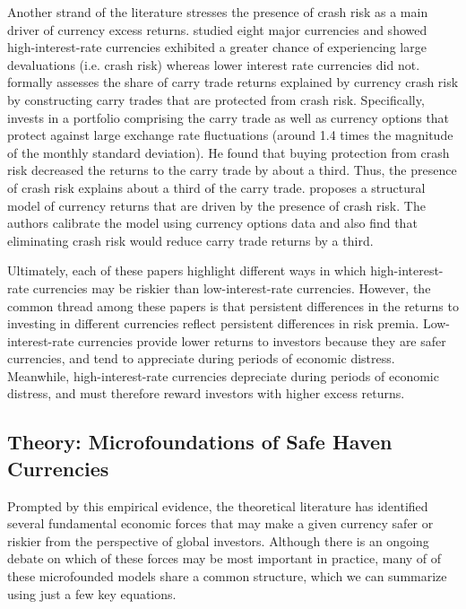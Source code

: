 \documentclass{ar-1col}
\begin{document}
Another strand of the literature stresses the presence of crash risk as a main driver of currency excess returns. \citet{Brunnermeieretal2009} studied eight major currencies and showed high-interest-rate currencies exhibited a greater chance of experiencing large devaluations (i.e. crash risk) whereas lower interest rate currencies did not. \citet{Jurek2014} formally assesses the share of carry trade returns explained by currency crash risk by constructing carry trades that are protected from crash risk. Specifically, \citet{Jurek2014} invests in a portfolio comprising the carry trade as well as currency options that protect against large exchange rate fluctuations (around 1.4 times the magnitude of the monthly standard deviation). He found that buying protection from crash risk decreased the returns to the carry trade by about a third. Thus, the presence of crash risk explains about a third of the carry trade. \citet{Farhietal2015} proposes a structural model of currency returns that are driven by the presence of crash risk. The authors calibrate the model using currency options data and also find that eliminating crash risk would reduce carry trade returns by a third.



Ultimately, each of these papers highlight different ways in which high-interest-rate currencies may be riskier than low-interest-rate currencies. However, the common thread among these papers is that persistent differences in the returns to investing in different currencies reflect persistent differences in risk premia. Low-interest-rate currencies provide lower returns to investors because they are safer currencies, and tend to appreciate during periods of economic distress. Meanwhile, high-interest-rate currencies depreciate during periods of economic distress, and must therefore reward investors with higher excess returns.



\subsection{Theory: Microfoundations of Safe Haven Currencies}

Prompted by this empirical evidence, the theoretical literature has identified several fundamental economic forces that may make a given currency safer or riskier from the perspective of global investors. Although there is an ongoing debate on which of these forces may be most important in practice, many of of these microfounded models share a common structure, which we can summarize using just a few key equations.
\end{document}
